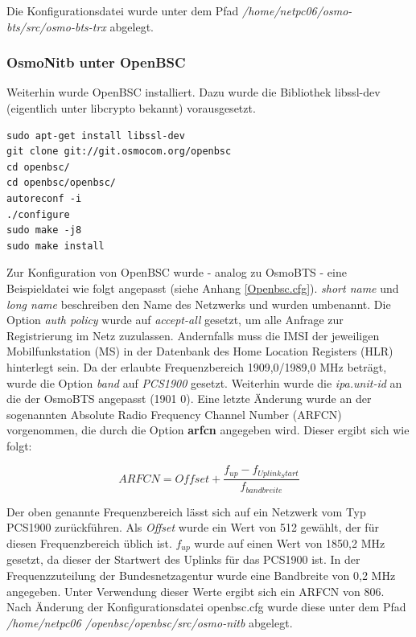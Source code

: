 Die Konfigurationsdatei wurde unter dem Pfad \textit{/home/netpc06/osmo-bts/src/osmo-bts-trx} abgelegt. 

\subsubsection{OsmoNitb unter OpenBSC}
Weiterhin wurde OpenBSC installiert. Dazu wurde die Bibliothek libssl-dev (eigentlich unter libcrypto bekannt) vorausgesetzt.

\begin{lstlisting}
sudo apt-get install libssl-dev
git clone git://git.osmocom.org/openbsc
cd openbsc/
cd openbsc/openbsc/
autoreconf -i
./configure 
sudo make -j8
sudo make install
\end{lstlisting}

Zur Konfiguration von OpenBSC wurde - analog zu OsmoBTS - eine Beispieldatei wie folgt angepasst (siehe Anhang \ref{Openbsc.cfg}). \textit{short name} und \textit{long name} beschreiben den Name des Netzwerks und wurden umbenannt. Die Option \textit{auth policy} wurde auf \textit{accept-all} gesetzt, um alle Anfrage zur Registrierung im Netz zuzulassen. Andernfalls muss die IMSI der jeweiligen Mobilfunkstation (MS) in der Datenbank des Home Location Registers (HLR) hinterlegt sein. Da der erlaubte Frequenzbereich 1909,0/1989,0 MHz beträgt, wurde die Option \textit{band} auf \textit{PCS1900} gesetzt. Weiterhin wurde die \textit{ipa.unit-id} an die der OsmoBTS angepasst (1901 0). Eine letzte Änderung wurde an der sogenannten Absolute Radio Frequency Channel Number (ARFCN) vorgenommen, die durch die Option \textbf{arfcn} angegeben wird. Dieser ergibt sich wie folgt:

\begin{equation}
ARFCN = Offset + \frac{f_{up} - f_{Uplink_Start}}{f_{bandbreite}}
\end{equation}

Der oben genannte Frequenzbereich lässt sich auf ein Netzwerk vom Typ PCS1900 zurückführen. Als \textit{Offset} wurde ein Wert von 512 gewählt, der für diesen Frequenzbereich üblich ist. $f_{up}$ wurde auf einen Wert von 1850,2 MHz gesetzt, da dieser der Startwert des Uplinks für das PCS1900 ist. In der Frequenzzuteilung der Bundesnetzagentur wurde eine Bandbreite von 0,2 MHz angegeben. Unter Verwendung dieser Werte ergibt sich ein ARFCN von 806.\\

Nach Änderung der Konfigurationsdatei openbsc.cfg wurde diese unter dem Pfad \textit{/home/netpc06
/openbsc/openbsc/src/osmo-nitb} abgelegt.

